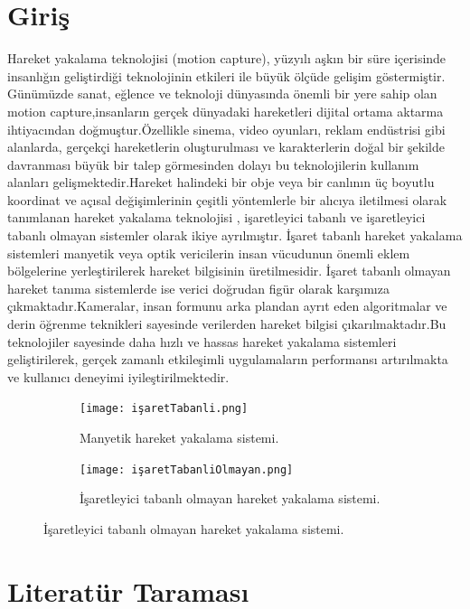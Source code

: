 \documentclass[12pt, a4paper]{article}
\begin{document}
\section{Giriş}  Hareket yakalama teknolojisi (motion capture), yüzyılı aşkın bir süre içerisinde
insanlığın geliştirdiği teknolojinin etkileri ile büyük ölçüde gelişim göstermiştir.
Günümüzde sanat, eğlence ve teknoloji dünyasında önemli bir yere sahip olan motion capture,insanların gerçek dünyadaki hareketleri dijital ortama aktarma ihtiyacından doğmuştur.Özellikle sinema, video oyunları,
reklam endüstrisi gibi alanlarda, gerçekçi hareketlerin oluşturulması ve karakterlerin doğal bir şekilde davranması büyük bir talep görmesinden dolayı bu teknolojilerin kullanım alanları gelişmektedir.Hareket halindeki bir obje veya bir canlının üç boyutlu koordinat ve açısal değişimlerinin çeşitli yöntemlerle
bir alıcıya iletilmesi olarak tanımlanan hareket yakalama teknolojisi  \cite{ozkiricscci2022motion}, işaretleyici tabanlı ve işaretleyici tabanlı olmayan sistemler
olarak ikiye ayrılmıştır. İşaret tabanlı hareket yakalama sistemleri manyetik veya optik vericilerin insan vücudunun önemli eklem bölgelerine yerleştirilerek hareket bilgisinin üretilmesidir. İşaret tabanlı olmayan hareket tanıma sistemlerde ise verici doğrudan figür olarak karşımıza çıkmaktadır.Kameralar, insan formunu arka plandan ayrıt eden algoritmalar ve derin öğrenme teknikleri sayesinde verilerden hareket bilgisi çıkarılmaktadır.Bu teknolojiler sayesinde  daha hızlı ve hassas hareket yakalama sistemleri geliştirilerek, gerçek zamanlı etkileşimli uygulamaların performansı artırılmakta ve kullanıcı deneyimi iyileştirilmektedir.\\
 

\begin{figure}[h!]
	\centering
	\begin{subfigure}[b]{0.4\linewidth}
		\texttt{[image: işaretTabanli.png]}
		\caption{Manyetik hareket yakalama sistemi.}
	\end{subfigure}
	\begin{subfigure}[b]{0.4\linewidth}
		\texttt{[image: işaretTabanliOlmayan.png]}
		\caption{İşaretleyici tabanlı olmayan hareket yakalama sistemi.}
	\end{subfigure}

\end{figure}


\newpage
\section{Literatür Taraması}
\end{document}
